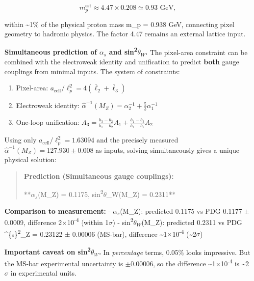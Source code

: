 \documentclass[11pt,a4paper]{article}
\theoremstyle{remark}
\providecommand{\tightlist}{%
  \setlength{\itemsep}{0pt}\setlength{\parskip}{0pt}}
\begin{document}
\[
m_p^{\mathrm{est}} \approx 4.47 \times 0.208 \simeq 0.93 \text{ GeV},
\]

within \textasciitilde1\% of the physical proton mass m\_p = 0.938 GeV, connecting pixel
geometry to hadronic physics. The factor 4.47 remains an external lattice input.

\textbf{Simultaneous prediction of \(\alpha_s\) and sin\textsuperscript{2}\(\theta_W\).} The pixel-area constraint can
be combined with the electroweak identity and unification to predict \textbf{both}
gauge couplings from minimal inputs. The system of constraints:

\begin{enumerate}
\def\labelenumi{\arabic{enumi}.}
\tightlist
\item
  Pixel-area: \(a_{\mathrm{cell}}/\ell_p^2 = 4(\bar{\ell}_2 + \bar{\ell}_3)\)
\item
  Electroweak identity: \(\hat{\alpha}^{-1}(M_Z) = \alpha_2^{-1} + \frac{5}{3}\alpha_1^{-1}\)
\item
  One-loop unification: \(A_3 = \frac{b_3-b_2}{b_1-b_2}A_1 + \frac{b_1-b_3}{b_1-b_2}A_2\)
\end{enumerate}

Using only \(a_{\mathrm{cell}}/\ell_p^2 = 1.63094\) and the precisely measured
\(\hat{\alpha}^{-1}(M_Z) = 127.930 \pm 0.008\) as inputs, solving simultaneously
gives a unique physical solution:

\begin{quote}
\textbf{Prediction (Simultaneous gauge couplings):}

**\(\alpha_s\)(M\_Z) = 0.1175, sin\textsuperscript{2}\ensuremath{\theta}\_W(M\_Z) = 0.2311**
\end{quote}

\textbf{Comparison to measurement:}
- \(\alpha_s\)(M\_Z): predicted 0.1175 vs PDG 0.1177 \ensuremath{\pm} 0.0009, difference 2\ensuremath{\times}10\textsuperscript{-4} (within 1\ensuremath{\sigma})
- sin\textsuperscript{2}\(\theta_W\)(M\_Z): predicted 0.2311 vs PDG \^{}\{s\}\textsuperscript{2}\_Z = 0.23122 \ensuremath{\pm} 0.00006 (MS-bar), difference \textasciitilde1\ensuremath{\times}10\textsuperscript{-4} (\textasciitilde2\ensuremath{\sigma})

\textbf{Important caveat on sin\textsuperscript{2}\(\theta_W\).} In \emph{percentage} terms, 0.05\% looks impressive. But
the MS-bar experimental uncertainty is \ensuremath{\pm}0.00006, so the difference \textasciitilde1\ensuremath{\times}10\textsuperscript{-4} is
\textasciitilde2\ensuremath{\sigma} in experimental units.
\end{document}
